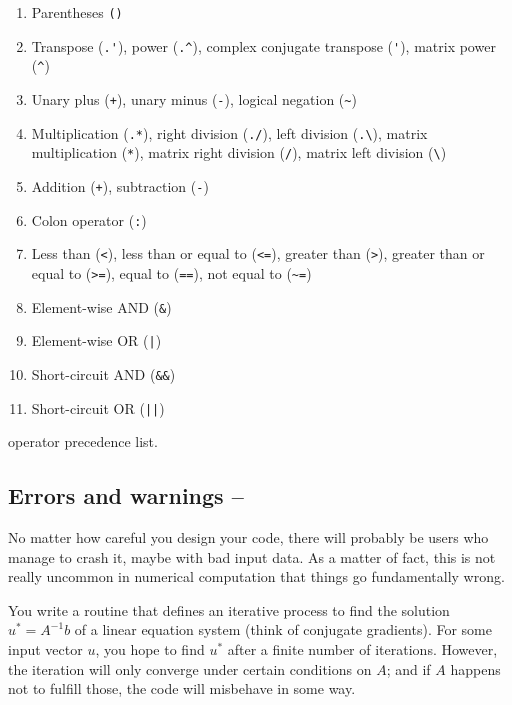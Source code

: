 \begin{table}
\begin{enumerate}
\item Parentheses \lstinline!()!
\item Transpose (\lstinline!.'!), power (\lstinline!.^!), complex conjugate transpose (\lstinline!'!), matrix power (\lstinline!^!)
\item Unary plus (\lstinline!+!), unary minus (\lstinline!-!), logical negation (\lstinline!~!)
\item Multiplication (\lstinline!.*!), right division (\lstinline!./!), left division (\lstinline!.\!), matrix multiplication (\lstinline!*!), matrix right division (\lstinline!/!), matrix left division (\lstinline!\!)
\item Addition (\lstinline!+!), subtraction (\lstinline!-!)
\item Colon operator (\lstinline!:!)
\item Less than (\lstinline!<!), less than or equal to (\lstinline!<=!), greater than (\lstinline!>!), greater than or equal to (\lstinline!>=!), equal to (\lstinline!==!), not equal to (\lstinline!~=!)
\item Element-wise AND (\lstinline!&!)
\item Element-wise OR (\lstinline!|!)
\item Short-circuit AND (\lstinline!&&!)
\item Short-circuit OR (\lstinline!||!)
\end{enumerate}
\caption{\matlab{} operator precedence list.}
\label{table:operator-precedence}
\end{table}


\subsection{Errors and warnings -- \cleansymbol\cleansymbol}

No matter how careful you design your code, there will probably be users who manage to crash it, maybe with bad input data. As a matter of fact, this is not really uncommon in numerical computation that things go fundamentally wrong.

\begin{example}
You write a routine that defines an iterative process to find the solution $u^* = A^{-1}b$ of a linear equation system (think of conjugate gradients). For some input vector $u$, you hope to find $u^*$ after a finite number of iterations. However, the iteration will only converge under certain conditions on $A$; and if $A$ happens not to fulfill those, the code will misbehave in some way.
\end{example}

